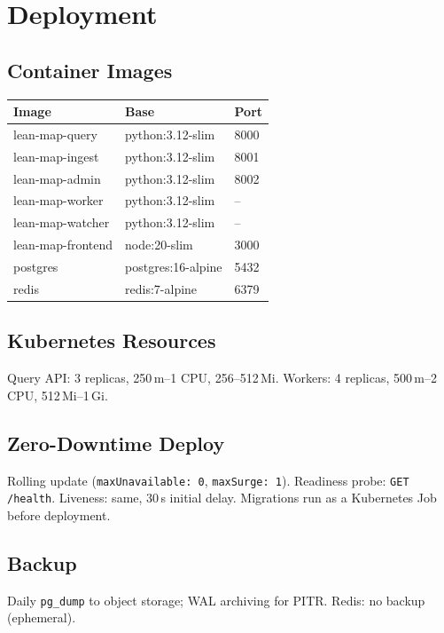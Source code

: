 \chapter{Deployment}

\section{Container Images}

\begin{table}[h]
\centering
\begin{tabular}{@{}lll@{}}
\toprule
\textbf{Image} & \textbf{Base} & \textbf{Port} \\
\midrule
lean-map-query    & python:3.12-slim & 8000 \\
lean-map-ingest   & python:3.12-slim & 8001 \\
lean-map-admin    & python:3.12-slim & 8002 \\
lean-map-worker   & python:3.12-slim & -- \\
lean-map-watcher  & python:3.12-slim & -- \\
lean-map-frontend & node:20-slim     & 3000 \\
postgres          & postgres:16-alpine & 5432 \\
redis             & redis:7-alpine   & 6379 \\
\bottomrule
\end{tabular}
\end{table}

\section{Kubernetes Resources}
Query API: 3 replicas, 250\,m--1 CPU, 256--512\,Mi.
Workers: 4 replicas, 500\,m--2 CPU, 512\,Mi--1\,Gi.

\section{Zero-Downtime Deploy}
Rolling update (\texttt{maxUnavailable: 0}, \texttt{maxSurge: 1}).
Readiness probe: \texttt{GET /health}.  Liveness: same, 30\,s initial delay.
Migrations run as a Kubernetes Job before deployment.

\section{Backup}
Daily \texttt{pg\_dump} to object storage; WAL archiving for PITR.
Redis: no backup (ephemeral).

